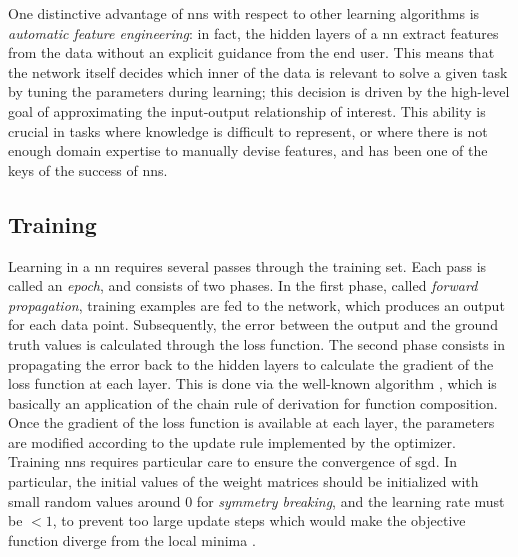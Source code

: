 One distinctive advantage of \glspl{nn} with respect to other learning algorithms is \emph{automatic feature engineering}: in fact, the hidden layers of a \gls{nn} extract features from the data without an explicit guidance from the end user. This means that the network itself decides which inner  of the data is relevant to solve a given task by tuning the parameters during learning; this decision is driven by the high-level goal of approximating the input-output relationship of interest. This ability is crucial in tasks where knowledge is difficult to represent, or where there is not enough domain expertise to manually devise features, and has been one of the keys of the success of \glspl{nn}.

\subsection{Training}\label{sec:training}
Learning in a \gls{nn} requires several passes through the training set. Each pass is called an \emph{epoch}, and consists of two phases. In the first phase, called \emph{forward propagation}, training examples are fed to the network, which produces an output for each data point. Subsequently, the error between the output and the ground truth values is calculated through the loss function. The second phase consists in propagating the error back to the hidden layers to calculate the gradient of the loss function at each layer. This is done via the well-known  algorithm \citep{rumelhart1986backprop}, which is basically an application of the chain rule of derivation for function composition. Once the gradient of the loss function is available at each layer, the parameters are modified according to the update rule implemented by the optimizer. Training \glspl{nn} requires particular care to ensure the convergence of \gls{sgd}. In particular, the initial values of the weight matrices should be initialized with small random values around 0 for \emph{symmetry breaking}, and the learning rate must be $< 1$, to prevent too large update steps which would make the objective function diverge from the local minima \citep{lecun1998backprop}.


